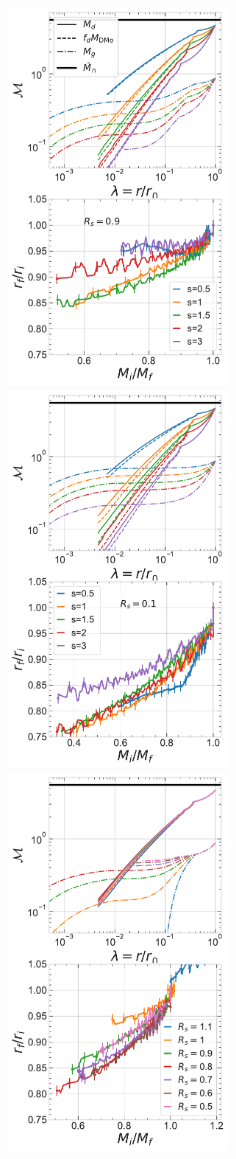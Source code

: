 \begin{figure}[htbp]
\centering
\includegraphics[height=10cm,trim={0 0 0.2cm 0},clip]{plots/relx_reln_shocked_vary-s.pdf}
\includegraphics[height=10cm,trim={2.2cm 0cm 0.2cm 0},clip]{plots/relx_reln_cold_vary-s.pdf}
\includegraphics[height=10cm,trim={2.2cm 0 0.2cm 0},clip]{plots/relx_reln_shocked_vary-lamshsp.pdf}

\end{figure}
